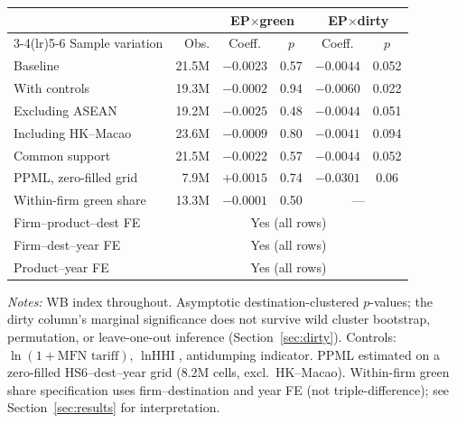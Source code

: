 \small
\begin{threeparttable}
\begin{tabular}{lrcccc}
\toprule
 & & \multicolumn{2}{c}{EP$\times$green} & \multicolumn{2}{c}{EP$\times$dirty} \\
\cmidrule(lr){3-4}\cmidrule(lr){5-6}
Sample variation & Obs. & Coeff. & $p$ & Coeff. & $p$ \\
\midrule
Baseline & 21.5M & $-0.0023$ & 0.57 & $-0.0044$ & 0.052 \\
With controls & 19.3M & $-0.0002$ & 0.94 & $-0.0060$ & 0.022 \\
Excluding ASEAN & 19.2M & $-0.0025$ & 0.48 & $-0.0044$ & 0.051 \\
Including HK--Macao & 23.6M & $-0.0009$ & 0.80 & $-0.0041$ & 0.094 \\
Common support & 21.5M & $-0.0022$ & 0.57 & $-0.0044$ & 0.052 \\
\midrule
PPML, zero-filled grid & 7.9M & $+0.0015$ & 0.74 & $-0.0301$ & 0.06 \\
Within-firm green share & 13.3M & $-0.0001$ & 0.50 & \multicolumn{2}{c}{---} \\
\midrule
Firm--product--dest FE & \multicolumn{5}{c}{Yes (all rows)} \\
Firm--dest--year FE & \multicolumn{5}{c}{Yes (all rows)} \\
Product--year FE & \multicolumn{5}{c}{Yes (all rows)} \\
\bottomrule
\end{tabular}
\begin{tablenotes}\footnotesize
\item \emph{Notes:} WB index throughout. Asymptotic destination-clustered $p$-values; the dirty column's marginal significance does not survive wild cluster bootstrap, permutation, or leave-one-out inference (Section~\ref{sec:dirty}). Controls: $\ln(1+\text{MFN tariff})$, $\ln\text{HHI}$, antidumping indicator. PPML estimated on a zero-filled HS6--dest--year grid (8.2M cells, excl.\ HK--Macao). Within-firm green share specification uses firm--destination and year FE (not triple-difference); see Section~\ref{sec:results} for interpretation.
\end{tablenotes}
\end{threeparttable}

